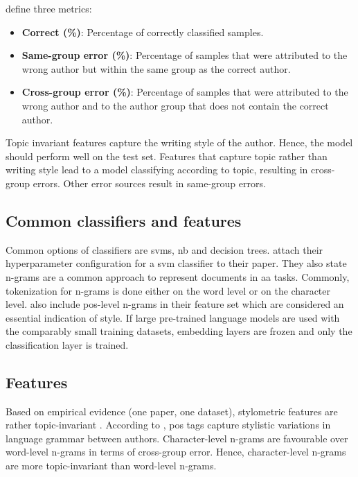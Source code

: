 \citet{altakrori_topic_2021} define three metrics:
\begin{itemize}
    \item \textbf{Correct (\%)}: Percentage of correctly classified samples.
    \item \textbf{Same-group error (\%)}: Percentage of samples that were attributed to the wrong author but within the same group 
    as the correct author.
    \item \textbf{Cross-group error (\%)}: Percentage of samples that were attributed to the wrong author and to the author group 
    that does not contain the correct author.
\end{itemize}

Topic invariant features capture the writing style of the author.
Hence, the model should perform well on the test set.
Features that capture topic rather than writing style lead to a model classifying according to topic, 
resulting in cross-group errors.
Other error sources result in same-group errors.

\subsection{Common classifiers and features}
\label{sec:topic_confusion_classifiers}
Common options of classifiers are \acp{svm}, \ac{nb} and decision trees.
\citet{altakrori_topic_2021} attach their hyperparameter configuration for a \ac{svm} classifier to their paper.
They also state n-grams are a common approach to represent documents in \ac{aa} tasks.
Commonly, tokenization for n-grams is done either on the word level or on the character level.
\citet{altakrori_topic_2021} also include \ac{pos}-level n-grams in their feature set 
which are considered an essential indication of style.
If large pre-trained language models are used with the comparably small training datasets, embedding layers are frozen and 
only the classification layer is trained.

\subsection{Features}
\label{sec:topic_confusion_features}
Based on empirical evidence (one paper, one dataset), stylometric features are rather topic-invariant \citep{altakrori_topic_2021}.
According to \citet{altakrori_topic_2021}, \ac{pos} tags capture stylistic variations in language grammar between authors.
Character-level n-grams are favourable over word-level n-grams in terms of cross-group error.
Hence, character-level n-grams are more topic-invariant than word-level n-grams.

